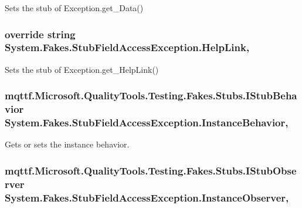 Sets the stub of Exception.\-get\-\_\-\-Data()

\hypertarget{class_system_1_1_fakes_1_1_stub_field_access_exception_ab8c002c8166c6be379f0a358fc087fb1}{
\subsubsection[{Help\-Link}]{\setlength{\rightskip}{0pt plus 5cm}override string System.\-Fakes.\-Stub\-Field\-Access\-Exception.\-Help\-Link\hspace{0.3cm}{\ttfamily [get]}, {\ttfamily [set]}}}\label{class_system_1_1_fakes_1_1_stub_field_access_exception_ab8c002c8166c6be379f0a358fc087fb1}


Sets the stub of Exception.\-get\-\_\-\-Help\-Link()

\hypertarget{class_system_1_1_fakes_1_1_stub_field_access_exception_a5a569de764d894f10a1802710cf94b54}{
\subsubsection[{Instance\-Behavior}]{\setlength{\rightskip}{0pt plus 5cm}mqttf.\-Microsoft.\-Quality\-Tools.\-Testing.\-Fakes.\-Stubs.\-I\-Stub\-Behavior System.\-Fakes.\-Stub\-Field\-Access\-Exception.\-Instance\-Behavior\hspace{0.3cm}{\ttfamily [get]}, {\ttfamily [set]}}}\label{class_system_1_1_fakes_1_1_stub_field_access_exception_a5a569de764d894f10a1802710cf94b54}


Gets or sets the instance behavior.

\hypertarget{class_system_1_1_fakes_1_1_stub_field_access_exception_ac6319f2115af4c1ce5a63f53fb67b252}{
\subsubsection[{Instance\-Observer}]{\setlength{\rightskip}{0pt plus 5cm}mqttf.\-Microsoft.\-Quality\-Tools.\-Testing.\-Fakes.\-Stubs.\-I\-Stub\-Observer System.\-Fakes.\-Stub\-Field\-Access\-Exception.\-Instance\-Observer\hspace{0.3cm}{\ttfamily [get]}, {\ttfamily [set]}}}\label{class_system_1_1_fakes_1_1_stub_field_access_exception_ac6319f2115af4c1ce5a63f53fb67b252}


